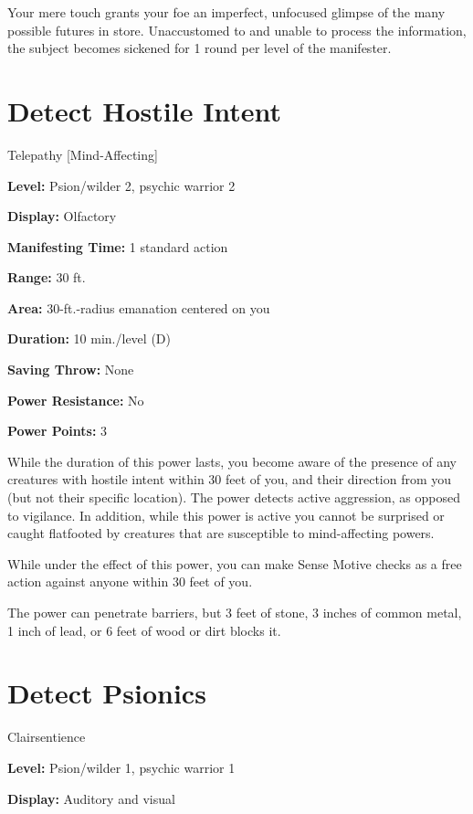 \documentclass{article}
\begin{document}
Your mere touch grants your foe an imperfect, unfocused glimpse of the many possible 
futures in store. Unaccustomed to and unable to process the information, the subject 
becomes sickened for 1 round per level of the manifester.

\vspace{12pt}
\section*{Detect Hostile Intent}

Telepathy [Mind-Affecting]

\textbf{Level:} Psion/wilder 2, psychic warrior 2

\textbf{Display:} Olfactory

\textbf{Manifesting Time:} 1 standard action

\textbf{Range:} 30 ft.

\textbf{Area:} 30-ft.-radius emanation centered on you

\textbf{Duration:} 10 min./level (D)

\textbf{Saving Throw:} None

\textbf{Power Resistance:} No

\textbf{Power Points:} 3

While the duration of this power lasts, you become aware of the presence of any 
creatures with hostile intent within 30 feet of you, and their direction from you 
(but not their specific location). The power detects active aggression, as opposed 
to vigilance. In addition, while this power is active you cannot be surprised or 
caught flatfooted by creatures that are susceptible to mind-affecting powers.

While under the effect of this power, you can make Sense Motive checks as a free 
action against anyone within 30 feet of you.

The power can penetrate barriers, but 3 feet of stone, 3 inches of common metal, 
1 inch of lead, or 6 feet of wood or dirt blocks it.

\vspace{12pt}
\section*{Detect Psionics}

Clairsentience

\textbf{Level:} Psion/wilder 1, psychic warrior 1

\textbf{Display:} Auditory and visual
\end{document}
